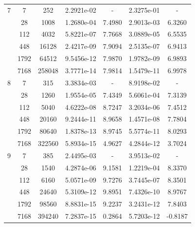 \begin{longtable}{| c | c c | c c | c c |}
	\hline

	7	& 7 & 252 & 2.2921e-02 & - & 2.3275e-01 & - \\
		& 28 & 1008 & 1.2680e-04 & 7.4980 & 2.9013e-03 & 6.3260 \\
		& 112 & 4032 & 5.8221e-07 & 7.7668 & 3.0889e-05 & 6.5535 \\
		& 448 & 16128 & 2.4217e-09 & 7.9094 & 2.5135e-07 & 6.9413 \\
		& 1792 & 64512 & 9.5456e-12 & 7.9870 & 1.9782e-09 & 6.9893 \\
		& 7168 & 258048 & 3.7771e-14 & 7.9814 & 1.5479e-11 & 6.9978 \\

    \hline

	8	& 7 & 315 & 3.3834e-03 & - & 8.9198e-02 & - \\
		& 28 & 1260 & 1.9554e-05 & 7.4349 & 5.6061e-04 & 7.3139 \\
		& 112 & 5040 & 4.6222e-08 & 8.7247 & 3.2034e-06 & 7.4512 \\
		& 448 & 20160 & 9.2444e-11 & 8.9658 & 1.4571e-08 & 7.7804 \\
		& 1792 & 80640 & 1.8378e-13 & 8.9745 & 5.5774e-11 & 8.0293 \\
		& 7168 & 322560 & 5.8934e-15 & 4.9627 & 4.2844e-12 & 3.7024 \\

    \hline

	9	& 7 & 385 & 2.4495e-03 & - & 3.9513e-02 & - \\
		& 28 & 1540 & 4.2874e-06 & 9.1581 & 1.2219e-04 & 8.3370 \\
		& 112 & 6160 & 5.0571e-09 & 9.7276 & 3.7445e-07 & 8.3501 \\
		& 448 & 24640 & 5.3109e-12 & 9.8951 & 7.4326e-10 & 8.9767 \\
		& 1792 & 98560 & 8.8831e-15 & 9.2237 & 3.2431e-12 & 7.8403 \\
		& 7168 & 394240 & 7.2837e-15 & 0.2864 & 5.7203e-12 & -0.8187 \\

\end{longtable}



